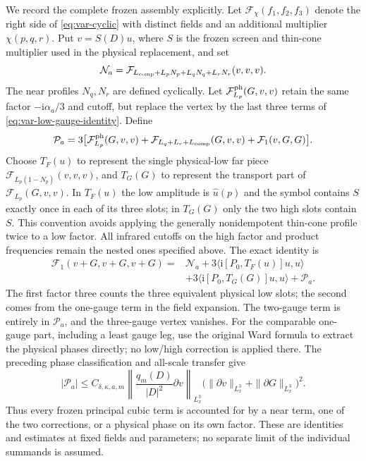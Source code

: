 \documentclass[11pt,a4paper]{article}
\numberwithin{equation}{section}
\newcommand{\ip}[2]{\langle #1,#2\rangle}
\newcommand{\f}[2]{\frac{#1}{#2}}
\newcommand{\ii}{\mathrm{i}}
\theoremstyle{definition}
\begin{document}
We record the complete frozen assembly explicitly. Let
$\mathcal F_\chi(f_1,f_2,f_3)$ denote the right side of
\eqref{eq:var-cyclic} with distinct fields and an additional multiplier
$\chi(p,q,r)$. Put $v=S(D)u$, where $S$ is the frozen screen and
thin-cone multiplier used in the physical replacement, and set
\begin{equation*}
\mathcal N_a=\mathcal F_{L_{\rm comp}+L_pN_p+L_qN_q+L_rN_r}(v,v,v).
\end{equation*}
The near profiles $N_q,N_r$ are defined cyclically. Let
$\mathcal F^{\rm ph}_{L_p}(G,v,v)$ retain the same factor
$-\ii \alpha_a/3$ and cutoff, but replace the vertex by the last three
terms of \eqref{eq:var-low-gauge-identity}. Define
\begin{equation*}
\mathcal P_a=3\bigl[
 \mathcal F^{\rm ph}_{L_p}(G,v,v)
 +\mathcal F_{L_q+L_r+L_{\rm comp}}(G,v,v)
 +\mathcal F_1(v,G,G)\bigr].
\end{equation*}
Choose $T_F(u)$ to represent the single physical-low far piece
$\mathcal F_{L_p(1-N_p)}(v,v,v)$, and $T_G(G)$ to represent the
transport part of $\mathcal F_{L_p}(G,v,v)$.
In $T_F(u)$ the low amplitude is $\widehat u(p)$ and the symbol
contains $S$ exactly once in each of its three slots; in $T_G(G)$
only the two high slots contain $S$. This convention avoids applying
the generally nonidempotent thin-cone profile twice to a low factor.
All infrared cutoffs on the high factor and product frequencies remain the nested ones
specified above. The exact identity is
\begin{equation}\label{eq:var-full-assembly}
\begin{split}
\mathcal F_1(v+G,v+G,v+G)
={}&\mathcal N_a+3\ip{\ii [P_0,T_F(u)]u}{u}\\
&+3\ip{\ii [P_0,T_G(G)]u}{u}+\mathcal P_a.
\end{split}
\end{equation}
The first factor three counts the three equivalent physical low slots;
the second comes from the one-gauge term in the field expansion.
The two-gauge term is entirely in $\mathcal P_a$, and the three-gauge
vertex vanishes. For the comparable one-gauge part, including a least
gauge leg, use the original Ward formula to extract the physical
phases directly; no low/high correction is applied there.
The preceding phase classification and all-scale transfer give
\begin{equation*}
|\mathcal P_a|\leq C_{\delta,\kappa,a,m}
 \left\|\f{q_m(D)}{|D|^2}\partial v\right\|_{L^3_x}
 \bigg(\|\partial v\|_{L^3_x}+\|\partial G\|_{L^3_x}\bigg)^2.
\end{equation*}
Thus every frozen principal cubic term is accounted for by a near
term, one of the two corrections, or a physical phase on its own
factor. These are identities and estimates at fixed fields and
parameters; no separate limit of the individual summands is assumed.
\end{document}
